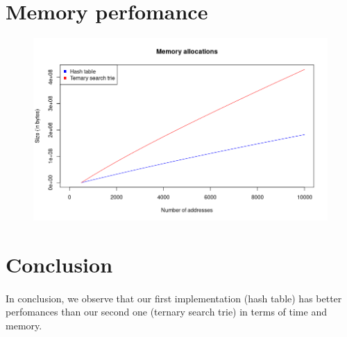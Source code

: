 \documentclass[a4paper, 11pt, oneside]{article}
\begin{document}
\section{Memory perfomance}

\begin{figure}[H]
  \centering
  \includegraphics[scale=.6]{plots/mem.png}
\end{figure}

\section{Conclusion}
\paragraph{}In conclusion, we observe that our first implementation (hash table) has better perfomances than our second one (ternary search trie) in terms of time and memory.
\end{document}
